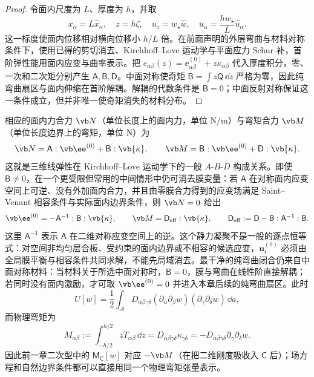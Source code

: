 \begin{proof}
令面内尺度为 $L$、厚度为 $h$，并取
\[
 x_\alpha=L\widehat x_\alpha,\quad z=h\zeta,\quad
 u_z=w_\star\widehat w,\quad
 u_\alpha=\frac{hw_\star}{L}\widehat u_\alpha .
\]
这一标度使面内位移相对横向位移小 $h/L$ 倍。在前面声明的外层弯曲与材料对称条件下，使用已得的剪切消去、Kirchhoff--Love 运动学与平面应力 Schur 补，首阶弹性能用面内应变与曲率表示。把
\(e_{\alpha\beta}(z)=\ee^{(0)}_{\alpha\beta}+z\kappa_{\alpha\beta}\)
代入厚度积分，零、一次和二次矩分别产生
\(\mathsf A,\mathsf B,\mathsf D\)。中面对称使奇矩
\(\mathsf B=\int z\mathsf Q\,\dd z\) 严格为零，因此纯弯曲扇区与面内伸缩在首阶解耦。解耦的代数条件是 $\mathsf B=0$；中面反射对称保证这一条件成立，但并非唯一使奇矩消失的材料分布。
\end{proof}

相应的面内力合力 \(\vb N\)（单位长度上的面内力，单位 \(\si{\newton\per\metre}\)）与弯矩合力 \(\vb M\)（单位长度边界上的弯矩，单位 \(\si{\newton}\)）为
\[
 \vb N=\mathsf A:\vb \ee^{(0)}+\mathsf B:\vb{\kappa},
 \qquad
 \vb M=\mathsf B:\vb \ee^{(0)}+\mathsf D:\vb{\kappa}.
\]
这就是三维线弹性在 Kirchhoff--Love 运动学下的一般 \(A\!\)-\(B\!\)-\(D\) 构成关系。即使 \(\mathsf B\neq0\)，在一个更受限但常用的中间情形中仍可消去膜变量：若 \(\mathsf A\) 在对称面内应变空间上可逆、没有外加面内合力，并且由零膜合力得到的应变场满足 Saint--Venant 相容条件与实际面内边界条件，则 \(\vb N=0\) 给出
\[
 \vb \ee^{(0)}=-\mathsf A^{-1}:\mathsf B:\vb{\kappa},
 \qquad
 \vb M=\mathsf D_{\rm eff}:\vb{\kappa},
 \qquad
 \mathsf D_{\rm eff}:=\mathsf D-\mathsf B:\mathsf A^{-1}:\mathsf B.
\]
这里 \(\mathsf A^{-1}\) 表示 \(\mathsf A\) 在二维对称应变空间上的逆。这个静力凝聚不是一般的逐点恒等式：对空间非均匀层合板、受约束的面内边界或不相容的候选应变，\(\bm u_t^{(0)}\) 必须由全局膜平衡与相容条件共同求解，不能先局域消去。最干净的纯弯曲闭合仍来自中面对称材料：当材料关于所选中面对称时，\(\mathsf B=0\)，膜与弯曲在线性阶直接解耦；若同时没有面内激励，才可取 \(\vb \ee^{(0)}=0\) 并进入本章后续的纯弯曲扇区。此时
\begin{equation}
 U[w]
 =\frac12\int_{\mathcal A}
 D_{\alpha\beta\gamma\delta}
 (\partial_\alpha\partial_\beta w)
 (\partial_\gamma\partial_\delta w)\,\dd a,
 \label{eq:phys-cont-general-plate-energy}
\end{equation}
而物理弯矩为
\begin{equation}
 M_{\alpha\beta}
 :=\int_{-h/2}^{h/2}zT_{\alpha\beta}\,\dd z
 =D_{\alpha\beta\gamma\delta}\kappa_{\gamma\delta}
 =-D_{\alpha\beta\gamma\delta}
 \partial_\gamma\partial_\delta w.
 \label{eq:phys-cont-general-plate-moment}
\end{equation}
因此前一章二次型中的 \(\mathsf M_{\mathsf C}[w]\) 对应 \(-\vb M\)（在把二维刚度吸收入 \(\mathsf C\) 后）；场方程和自然边界条件都可以直接用同一个物理弯矩张量表示。


